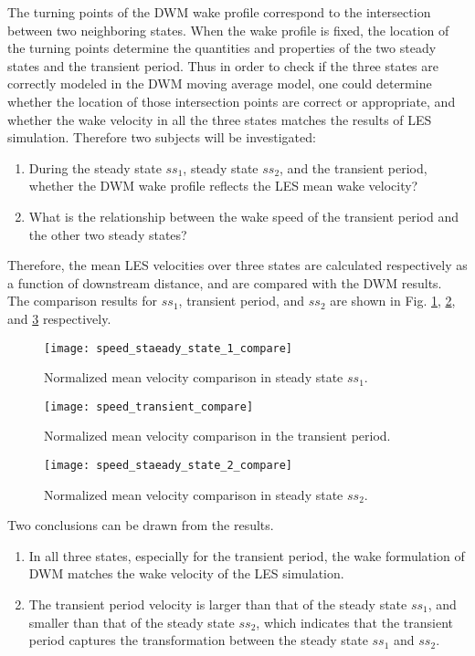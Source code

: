 \documentclass{umthesis}
\begin{document}
The turning points of the DWM wake profile correspond to the intersection between two neighboring states. When the wake profile is fixed, the location of the turning points determine the quantities and properties of the two steady states and the transient period. Thus in order to check if the three states are correctly modeled in the DWM moving average model, one could determine whether the location of those intersection points are correct or appropriate, and whether the wake velocity in all the three states matches the results of LES simulation. Therefore two subjects will be investigated:

\begin{enumerate}
  \item During the steady state $ss_1$, steady state $ss_2$, and the transient period, whether the DWM wake profile reflects the LES mean wake velocity?
  \item What is the relationship between the wake speed of the transient period and the other two steady states?
\end{enumerate}


Therefore, the mean LES velocities over three states are calculated respectively as a function of downstream distance, and are compared with the DWM results. The comparison results for $ss_1$, transient period, and $ss_2$ are shown in Fig. \ref{fig:speed_staeady_state_1_compare}, \ref{fig:speed_transient_compare}, and \ref{fig:speed_staeady_state_2_compare} respectively.

\begin{figure}
  \centering
  \texttt{[image: speed\_staeady\_state\_1\_compare]}
  \caption{Normalized mean velocity comparison in steady state $ss_1$.}\label{fig:speed_staeady_state_1_compare}
\end{figure}

\begin{figure}
  \centering
  \texttt{[image: speed\_transient\_compare]}
  \caption{Normalized mean velocity comparison in the transient period.}\label{fig:speed_transient_compare}
\end{figure}

\begin{figure}
  \centering
  \texttt{[image: speed\_staeady\_state\_2\_compare]}
  \caption{Normalized mean velocity comparison in steady state $ss_2$.}\label{fig:speed_staeady_state_2_compare}
\end{figure}

Two conclusions can be drawn from the results.
\begin{enumerate}
  \item In all three states, especially for the transient period, the wake formulation of DWM matches the wake velocity of the LES simulation.  
  \item The transient period velocity is larger than that of the steady state $ss_1$, and smaller than that of the steady state $ss_2$, which indicates that the transient period captures the transformation between the steady state $ss_1$ and $ss_2$.
\end{enumerate}
\end{document}
